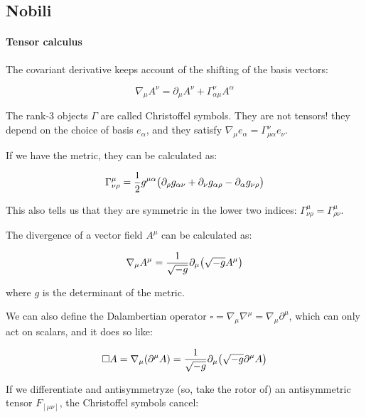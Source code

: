 \documentclass[main.tex]{subfiles}
\begin{document}
\subsection{Nobili}

\paragraph{Tensor calculus}

The covariant derivative keeps account of the shifting of the basis vectors:

\begin{equation}
    \nabla_\mu A^\nu = \partial_\mu A^\nu + \Gamma^\nu _{\alpha \mu}  A^\alpha
\end{equation}

The rank-3 objects $\Gamma$ are called Christoffel symbols. They are not tensors! they depend on the choice of basis $e_\alpha$, and they satisfy $\nabla _\mu e_\alpha = \Gamma ^\nu _{\mu \alpha} e_\nu$.

If we have the metric, they can be calculated as:

\begin{equation}
    \Gamma^\mu_{\nu \rho} = \frac{1}{2} g^{\mu \alpha} \qty(
    \partial_\rho g_{\alpha \nu} +
    \partial_\nu g_{\alpha \rho} -
    \partial_\alpha g_{\nu \rho}
    ) \label{eq:christoffel-symbols-from-metric}
\end{equation}

This also tells us that they are symmetric in the lower two indices: $\Gamma ^\mu _{\nu \rho} = \Gamma ^\mu _{\rho \nu}$.

The divergence of a vector field $A^\mu$ can be calculated as:

\begin{equation}
    \nabla_\mu A^\mu = \frac{1}{\sqrt{-g}}\partial_\mu \qty(\sqrt{-g}A^\mu) \label{eq:covariant-divergence}
\end{equation}

where $g$ is the determinant of the metric.

We can also define the Dalambertian operator $\square = \nabla_\mu \nabla^\mu = \nabla_\mu \partial^\mu$, which can only act on scalars, and it does so like:

\begin{equation}
    \square A = \nabla_\mu (\partial^\mu A) =  \frac{1}{\sqrt{-g}}\partial_\mu \qty(\sqrt{-g}\partial^\mu A)
\end{equation}

If we differentiate and antisymmetryze (so, take the rotor of) an antisymmetric tensor $F_{[\mu \nu]}$, the Christoffel symbols cancel:
\end{document}
